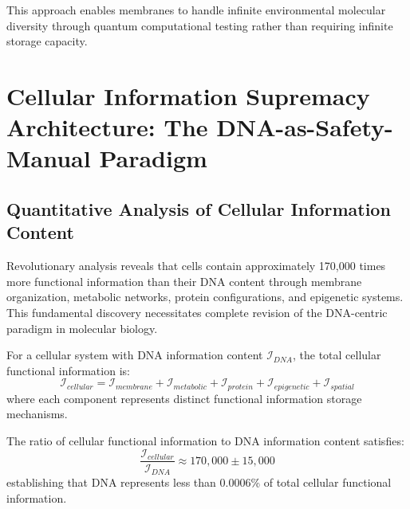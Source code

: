 \documentclass[11pt,a4paper]{article}
\begin{document}
This approach enables membranes to handle infinite environmental molecular diversity through quantum computational testing rather than requiring infinite storage capacity.

\section{Cellular Information Supremacy Architecture: The DNA-as-Safety-Manual Paradigm}

\subsection{Quantitative Analysis of Cellular Information Content}

Revolutionary analysis reveals that cells contain approximately 170,000 times more functional information than their DNA content through membrane organization, metabolic networks, protein configurations, and epigenetic systems. This fundamental discovery necessitates complete revision of the DNA-centric paradigm in molecular biology.

\begin{definition}
For a cellular system with DNA information content $\mathcal{I}_{DNA}$, the total cellular functional information is:
\begin{equation}
\mathcal{I}_{cellular} = \mathcal{I}_{membrane} + \mathcal{I}_{metabolic} + \mathcal{I}_{protein} + \mathcal{I}_{epigenetic} + \mathcal{I}_{spatial}
\end{equation}
where each component represents distinct functional information storage mechanisms.
\end{definition}

\begin{theorem}
The ratio of cellular functional information to DNA information content satisfies:
\begin{equation}
\frac{\mathcal{I}_{cellular}}{\mathcal{I}_{DNA}} \approx 170,000 \pm 15,000
\end{equation}
establishing that DNA represents less than 0.0006\% of total cellular functional information.
\end{theorem}
\end{document}
